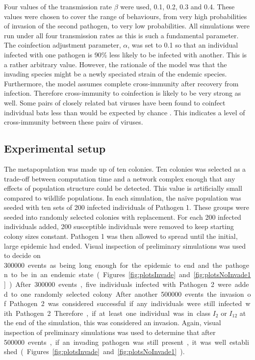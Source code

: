 Four values of the transmission rate $\beta$ were used, 0.1, 0.2, 0.3 and 0.4.
These values were chosen to cover the range of behaviours, from very high probabilities of invasion of the second pathogen, to very low probabilities.
All simulations were run under all four transmission rates as this is such a fundamental parameter.
The coinfection adjustment parameter, $\alpha$, was set to 0.1 so that an individual infected with one pathogen is 90\% less likely to be infected with another.
This is a rather arbitrary value.
However, the rationale of the model was that the invading species might be a newly speciated strain of the endemic species.
Furthermore, the model assumes complete cross-immunity after recovery from infection.
Therefore cross-immunity to coinfection is likely to be very strong as well.
Some pairs of closely related bat viruses have been found to coinfect individual bats less than would be expected by chance \cite{anthony2013strategy}.
This indicates a level of cross-immunity between these pairs of viruses. %





\subsection{Experimental setup}

The metapopulation was made up of ten colonies.
Ten colonies was selected as a trade-off between computation time and a network complex enough that any effects of population structure could be detected.
This value is artificially small compared to wildlife populations. 
In each simulation, the na{\"i}ve population was seeded with ten sets of 200 infected individuals of Pathogen 1.
These groups were seeded into randomly selected colonies with replacement.
For each 200 infected individuals added, 200 susceptible individuals were removed to keep starting colony sizes constant. 
Pathogen 1 was then allowed to spread until the initial, large epidemic had ended. 
Visual inspection of preliminary simulations was used to decide on \SI{300000} events as being long enough for the epidemic to end and the pathogen to be in an endemic state (Figures~\ref{fig:plotsInvade} and \ref{fig:plotsNoInvade1}).
After \SI{300000} events, five individuals infected with Pathogen 2 were added to one randomly selected colony. 
After another \SI{500000} events the invasion of Pathogen 2 was considered successful if any individuals were still infected with Pathogen 2.
Therefore, if at least one individual was in class $I_2$ or $I_{12}$ at the end of the simulation, this was considered an invasion.
Again, visual inspection of preliminary simulations was used to determine that after \SI{500000} events, if an invading pathogen was still present, it was well established (Figures~\ref{fig:plotsInvade} and \ref{fig:plotsNoInvade1}).

